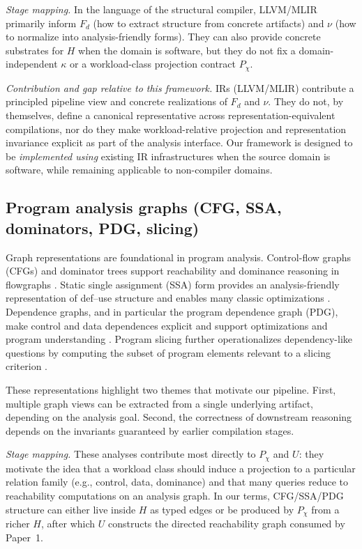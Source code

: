 \documentclass[11pt]{article}
\begin{document}
\emph{Stage mapping.} In the language of the structural compiler, LLVM/MLIR primarily inform $F_d$ (how to extract structure from concrete artifacts) and $\nu$ (how to normalize into analysis-friendly forms). They can also provide concrete substrates for $H$ when the domain is software, but they do not fix a domain-independent $\kappa$ or a workload-class projection contract $P_\chi$.

\emph{Contribution and gap relative to this framework.} IRs (LLVM/MLIR) contribute a principled pipeline view and concrete realizations of $F_d$ and $\nu$. They do not, by themselves, define a canonical representative across representation-equivalent compilations, nor do they make workload-relative projection and representation invariance explicit as part of the analysis interface. Our framework is designed to be \emph{implemented using} existing IR infrastructures when the source domain is software, while remaining applicable to non-compiler domains.

\subsection{Program analysis graphs (CFG, SSA, dominators, PDG, slicing)}
Graph representations are foundational in program analysis. Control-flow graphs (CFGs) and dominator trees support reachability and dominance reasoning in flowgraphs \cite{lengauer1979}. Static single assignment (SSA) form provides an analysis-friendly representation of def--use structure and enables many classic optimizations \cite{cytron1991}. Dependence graphs, and in particular the program dependence graph (PDG), make control and data dependences explicit and support optimizations and program understanding \cite{ferrante1987}. Program slicing further operationalizes dependency-like questions by computing the subset of program elements relevant to a slicing criterion \cite{weiser1981}.

These representations highlight two themes that motivate our pipeline. First, multiple graph views can be extracted from a single underlying artifact, depending on the analysis goal. Second, the correctness of downstream reasoning depends on the invariants guaranteed by earlier compilation stages.

\emph{Stage mapping.} These analyses contribute most directly to $P_\chi$ and $U$: they motivate the idea that a workload class should induce a projection to a particular relation family (e.g., control, data, dominance) and that many queries reduce to reachability computations on an analysis graph. In our terms, CFG/SSA/PDG structure can either live inside $H$ as typed edges or be produced by $P_\chi$ from a richer $H$, after which $U$ constructs the directed reachability graph consumed by Paper~1.
\end{document}
